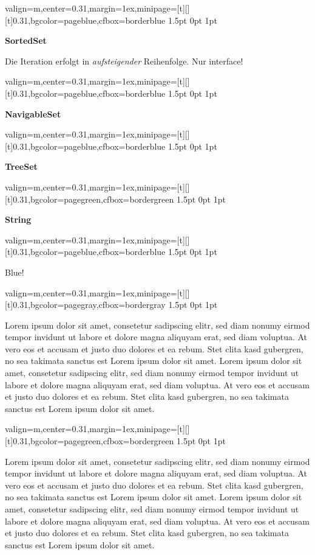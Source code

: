 \documentclass[11pt, a4paper, landscape]{article}
\newcommand{\fancyheader}[1]{
	\centerline{\sffamily \textbf{ \large #1}}
}
\newenvironment{fancybox}[2]
{
	\begin{adjustbox}{valign=m,center=0.31\textwidth,margin=1ex,minipage=[t][][t]{0.31\textwidth},bgcolor=#1,cfbox=#2 1.5pt 0pt 1pt}
	\begin{centering}
}
{
	\end{centering}
	\end{adjustbox}
}
\begin{document}
\begin{multicols}{3}
\begin{fancybox}{pageblue}{borderblue}
\fancyheader{SortedSet}


\raggedright{
	Die Iteration erfolgt in \emph{aufsteigender} Reihenfolge. Nur interface!
}
\end{fancybox}

\begin{fancybox}{pageblue}{borderblue}
\fancyheader{NavigableSet}

\end{fancybox}

\begin{fancybox}{pageblue}{borderblue}
\fancyheader{TreeSet}

\end{fancybox}

\begin{fancybox}{pagegreen}{bordergreen}
\fancyheader{String}

\end{fancybox}

\begin{fancybox}{pageblue}{borderblue}
	Blue!
\end{fancybox}


\begin{fancybox}{pagegray}{bordergray}
Lorem ipsum dolor sit amet, consetetur sadipscing elitr, sed diam nonumy eirmod tempor invidunt ut labore et dolore magna aliquyam erat, sed diam voluptua. At vero eos et accusam et justo duo dolores et ea rebum. Stet clita kasd gubergren, no sea takimata sanctus est Lorem ipsum dolor sit amet. Lorem ipsum dolor sit amet, consetetur sadipscing elitr, sed diam nonumy eirmod tempor invidunt ut labore et dolore magna aliquyam erat, sed diam voluptua. At vero eos et accusam et justo duo dolores et ea rebum. Stet clita kasd gubergren, no sea takimata sanctus est Lorem ipsum dolor sit amet.
\end{fancybox}

\begin{fancybox}{pagegreen}{bordergreen}
Lorem ipsum dolor sit amet, consetetur sadipscing elitr, sed diam nonumy eirmod tempor invidunt ut labore et dolore magna aliquyam erat, sed diam voluptua. At vero eos et accusam et justo duo dolores et ea rebum. Stet clita kasd gubergren, no sea takimata sanctus est Lorem ipsum dolor sit amet. Lorem ipsum dolor sit amet, consetetur sadipscing elitr, sed diam nonumy eirmod tempor invidunt ut labore et dolore magna aliquyam erat, sed diam voluptua. At vero eos et accusam et justo duo dolores et ea rebum. Stet clita kasd gubergren, no sea takimata sanctus est Lorem ipsum dolor sit amet.
\end{fancybox}


\end{multicols}
\end{document}
